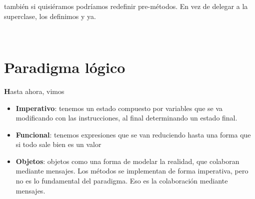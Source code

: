 \documentclass{report}
\theoremstyle{definition} %
\newenvironment{nota}[1]
    {\begin{leftbar}\textbf{#1}}
    {\end{leftbar}}
\begin{document}
también si quisiéramos podríamos redefinir pre-métodos. En vez de delegar a la
superclase, los definimos y ya.


\newcommand{\no}[1]{\neg #1}
\newcommand{\y}[2]{#1 \wedge #2}\
\newcommand{\por}[2]{#1 \vee #2}
\newcommand{\impl}[2]{#1 \supset #2}
\newcommand{\sii}[2]{#1 \iff #2}

\newcommand{\propVars}{\mathcal{V}}

\newcommand{\sat}[2]{#1 \models #2}
\newcommand{\nsat}[2]{#1 \not\models #2}

\newcommand{\set}[1]{\{ #1 \}} %
\newcommand{\emptyCl}{\square} %
\newcommand{\opuesto}[1]{\overline{#1}}
\newcommand{\resol}[2]{\trfrac{#1}{#2}}

\newcommand{\LPO}{\mathcal{L}}
\newcommand{\paratodo}[2]{\forall #1 . #2}
\newcommand{\existe}[2]{\exists #1 . #2}

\newcommand{\lpoass}[3]{#1[#2 \gets #3]}
\newcommand{\posat}[1]{s \models_M #1}
\newcommand{\notposat}[1]{s \not\models_M #1}

\newcommand{\sk}[1]{\text{\textbf{SK}}(#1)} %

\newcommand{\sust}[2]{#1 \gets #2}

\chapter{Paradigma lógico}

\begin{nota}
    Hasta ahora, vimos

    \begin{itemize}
        \item \textbf{Imperativo}: tenemos un estado compuesto por variables que
        se va modificando con las instrucciones, al final determinando un estado
        final.
        \item \textbf{Funcional}: tenemos expresiones que se van reduciendo
        hasta una forma que si todo sale bien es un valor
        \item \textbf{Objetos}: objetos como una forma de modelar la realidad,
        que colaboran mediante mensajes. Los métodos se implementan de forma
        imperativa, pero no es lo fundamental del paradigma. Eso es la
        colaboración mediante mensajes.
    \end{itemize}
\end{nota}
\end{document}
